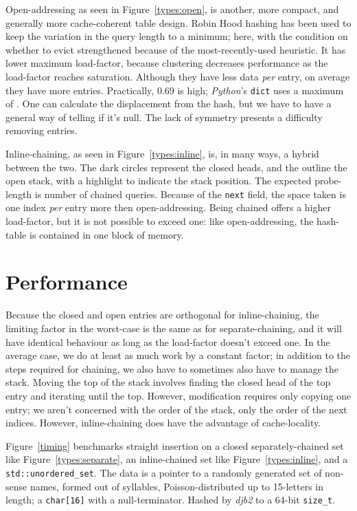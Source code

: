 \documentclass[12pt]{article}
\newcommand{\code}[1]{\colorbox{light-gray}{\texttt{#1}}}
\begin{document}
Open-addressing\cite{peterson1957addressing} as seen in Figure~\ref{types:open}, is another, more compact, and generally more cache-coherent table design. Robin Hood hashing\cite{celis1985robin} has been used to keep the variation in the query length to a minimum; here, with the condition on whether to evict strengthened because of the most-recently-used heuristic. It has lower maximum load-factor, because clustering decreases performance as the load-factor reaches saturation.\cite{skiena2008algorithm} Although they have less data {\it per} entry, on average they have more entries. Practically, 0.69 is high; {\it Python}'s \code{dict}\cite{knuth1998sorting} uses a maximum of . One can calculate the displacement from the hash, but we have to have a general way of telling if it's null. The lack of symmetry presents a difficulty removing entries.

Inline-chaining, as seen in Figure~\ref{types:inline}, is, in many ways, a hybrid between the two. The dark circles represent the closed heads, and the outline the open stack, with a highlight to indicate the stack position. The expected probe-length is number of chained queries. Because of the \code{next} field, the space taken is one index {\it per} entry more then open-addressing. Being chained offers a higher load-factor, but it is not possible to exceed one: like open-addressing, the hash-table is contained in one block of memory.

\section{Performance}

Because the closed and open entries are orthogonal for inline-chaining, the limiting factor in the worst-case is the same as for separate-chaining, and it will have identical behaviour as long as the load-factor doesn't exceed one. In the average case, we do at least as much work by a constant factor; in addition to the steps required for chaining, we also have to sometimes also have to manage the stack. Moving the top of the stack involves finding the closed head of the top entry and iterating until the top. However, modification requires only copying one entry; we aren't concerned with the order of the stack, only the order of the next indices. However, inline-chaining does have the advantage of cache-locality.

Figure~\ref{timing} benchmarks straight insertion on a closed separately-chained set like Figure~\ref{types:separate}, an inline-chained set like Figure~\ref{types:inline}, and a \code{std::unordered\_set}. The data is a pointer to a randomly generated set of non-sense names, formed out of syllables, Poisson-distributed up to 15-letters in length; a \code{char[16]} with a null-terminator. Hashed by {\it djb2} to a 64-bit \code{size\_t}.
\end{document}
